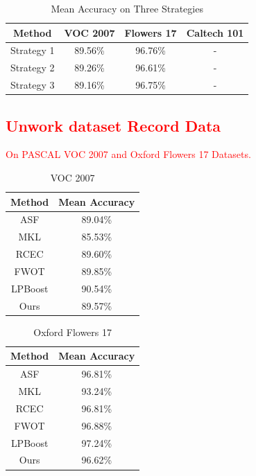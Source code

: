 \documentclass[letterpaper]{article}
\def\yanred{\textcolor{red}}
\begin{document}
\begin{table}[h]\small
\centering
\label{table:strategy}
\begin{tabular}{c|c|c|c}
\hline
Method                       & VOC 2007 &  Flowers 17  & Caltech 101 \\\hline
Strategy 1                   & 89.56\%  &  96.76\%     &    -        \\\hline
Strategy 2                   & 89.26\%  &  96.61\%     &    -        \\\hline
Strategy 3                   & 89.16\%  &  96.75\%     &    -        \\\hline
\hline
\end{tabular}
\caption{Mean Accuracy on Three Strategies}
\end{table}

\subsection{\yanred{Unwork dataset Record Data}}

\yanred{On PASCAL VOC 2007 and Oxford Flowers 17 Datasets.}

\begin{table}[h]\small
\centering
\label{table:voc2007}
\begin{tabular}{c|c}
\hline
Method                       & Mean Accuracy     \\\hline
ASF                          & 89.04\%           \\
MKL                          & 85.53\%           \\
RCEC                         & 89.60\%           \\
FWOT                         & 89.85\%           \\
LPBoost                      & 90.54\%           \\\hline
Ours                         & 89.57\%           \\
\hline
\end{tabular}
\caption{VOC 2007}
\end{table}


\begin{table}[h]\scriptsize
\centering
\label{table:flower17}
\begin{tabular}{c|c}
\hline
Method & Mean Accuracy\\\hline
ASF &  96.81\% \\
MKL &  93.24\% \\
RCEC &  96.81\% \\
FWOT &  96.88\% \\
LPBoost & 97.24\% \\\hline
Ours &  96.62\% \\
\hline
\end{tabular}
\caption{Oxford Flowers 17}
\end{table}
\end{document}
